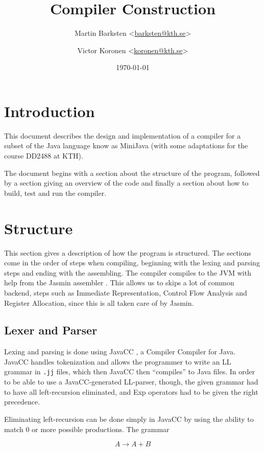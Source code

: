 \documentclass[a4paper]{article}
\title{Compiler Construction}
\author{%
    Martin Barksten <\href{mailto:barksten@kth.se}{barksten@kth.se}> \and
    Victor Koronen <\href{mailto:koronen@kth.se}{koronen@kth.se}>
}
\date{\today}
\begin{document}
\maketitle
\thispagestyle{empty}

\section{Introduction}

This document describes the design and implementation of a compiler for a subset
of the Java language know as MiniJava \cite{minijavaproject} (with some
adaptations \cite{dd2488project} for the course DD2488 at KTH).

The document begins with a section about the structure of the program, followed
by a section giving an overview of the code and finally a section about how to
build, test and run the compiler.

\section{Structure}

This section gives a description of how the program is structured. The sections
come in the order of steps when compiling, beginning with the lexing and parsing
steps and ending with the assembling. The compiler compiles to the JVM with help
from the Jasmin assembler \cite{jasmin}. This allows us to skips a lot of common
backend, steps such as Immediate Representation, Control Flow Analysis and
Register Allocation, since this is all taken care of by Jasmin.

\subsection{Lexer and Parser}

Lexing and parsing is done using JavaCC \cite{javacc}, a Compiler Compiler for
Java. JavaCC handles tokenization and allows the programmer to write an LL
grammar in \texttt{.jj} files, which then JavaCC then ``compiles'' to Java
files. In order to be able to use a JavaCC-generated LL-parser, though, the
given grammar had to have all left-recursion eliminated, and Exp operators had
to be given the right precedence.

Eliminating left-recursion can be done simply in JavaCC by using the
ability to match $0$ or more possible productions. The grammar

$$A \rightarrow A + B$$
\end{document}
